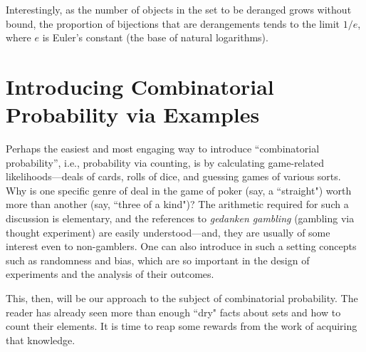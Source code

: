 \medskip

Interestingly, as the number of objects in the set to be deranged grows without bound, the
proportion of bijections that are derangements tends to the limit $1/e$, where $e$ is Euler's
constant (the base of natural logarithms).

\section{Introducing Combinatorial Probability via Examples}
\label{sec:combinatorial-prob}

  

Perhaps the easiest and most engaging way to introduce ``combinatorial probability'', i.e., probability via counting, is by calculating game-related likelihoods---deals of cards, rolls of dice, and guessing games of various sorts.  Why is one specific genre of deal in the game of poker (say, a ``straight") worth more than another (say, ``three of a kind")?  The arithmetic required for such a discussion is elementary, and the references to {\it gedanken gambling} (gambling via thought experiment) are easily understood---and, they are usually of some interest even to non-gamblers.  One can also introduce in such a setting concepts such as randomness and bias, which are so important in the design of experiments and the analysis of their outcomes.

\smallskip

This, then, will be our approach to the subject of combinatorial probability.  The reader has already seen more than enough ``dry" facts about sets and how to count their elements.  It is time to reap some rewards from the work of acquiring that knowledge. 

